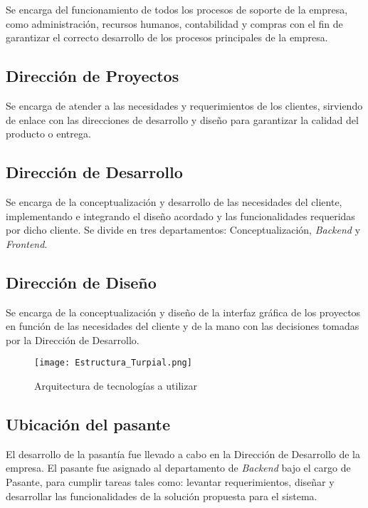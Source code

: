 Se encarga del funcionamiento de todos los procesos de soporte de la empresa, como administración, recursos humanos, contabilidad y compras con el fin de garantizar el correcto desarrollo de los procesos principales de la empresa. 

\subsection*{Dirección de Proyectos} 

Se encarga de atender a las necesidades y requerimientos de los clientes, sirviendo de enlace con las direcciones de desarrollo y diseño para garantizar la calidad del producto o entrega. 

\subsection*{Dirección de Desarrollo} 

Se encarga de la conceptualización y desarrollo de las necesidades del cliente, implementando e integrando el diseño acordado y las funcionalidades requeridas por dicho cliente. Se divide en tres departamentos: Conceptualización, \textit{Backend} y \textit{Frontend}.

\subsection*{Dirección de Diseño}

Se encarga de la conceptualización y diseño de la interfaz gráfica de los proyectos en función de las necesidades del cliente y de la mano con las decisiones tomadas por la Dirección de Desarrollo. 

\begin{figure}
\centering
\texttt{[image: Estructura\_Turpial.png]}
\caption{Arquitectura de tecnologías a utilizar}
\label{fig:figure6.2}
\end{figure}

\subsection*{Ubicación del pasante}

El desarrollo de la pasantía fue llevado a cabo en la Dirección de Desarrollo de la empresa. El pasante fue asignado al departamento de \textit{Backend} bajo el cargo de Pasante, para cumplir tareas tales como: levantar requerimientos, diseñar y desarrollar las funcionalidades de la solución propuesta para el sistema. 



